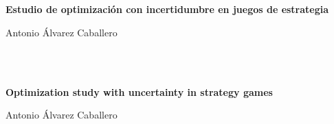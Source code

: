\chapter*{}


% 



\thispagestyle{empty}

\begin{center}
{\large\bfseries Estudio de optimización con incertidumbre en juegos de estrategia}\\
\end{center}
\begin{center}
Antonio Álvarez Caballero \\
\end{center}

\\

\vspace{0.7cm}
\\


\cleardoublepage


\thispagestyle{empty}


\begin{center}
{\large\bfseries Optimization study with uncertainty in strategy games}\\
\end{center}
\begin{center}
Antonio Álvarez Caballero \\
\end{center}

\\

\vspace{0.7cm}
\\



\chapter*{}
\thispagestyle{empty}

